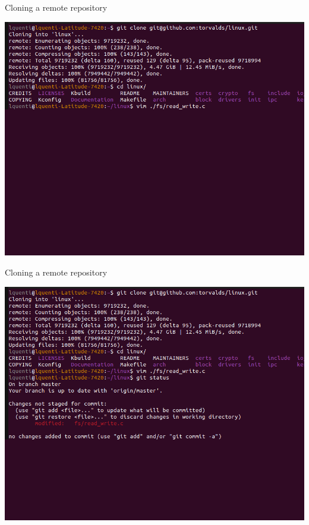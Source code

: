\documentclass[compress,aspectratio=169]{beamer}
\begin{document}
  \begin{frame}[noframenumbering]{Cloning a remote repository}
    \begin{center}
      \includegraphics[height=0.85\textheight]{./assets/terminal_slideshows/04_clone_edit_03.png}
    \end{center}
  \end{frame}
  \begin{frame}[noframenumbering]{Cloning a remote repository}
    \begin{center}
      \includegraphics[height=0.85\textheight]{./assets/terminal_slideshows/04_clone_edit_04.png}
    \end{center}
  \end{frame}
\end{document}
